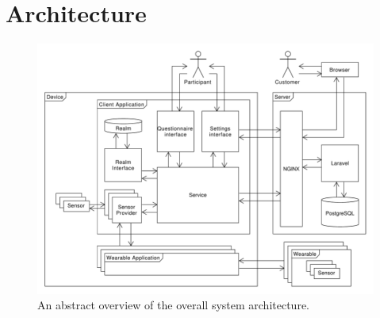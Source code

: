 
\chapter{Architecture}
\label{cha:architecture}


\begin{figure}[!htbp]
    \centering
    \includegraphics[width=\textwidth]{graphic/architecture/architecture.pdf}
    \caption{An abstract overview of the overall system architecture.}
    \label{fig:system_architecture}
\end{figure}
\FloatBarrier


